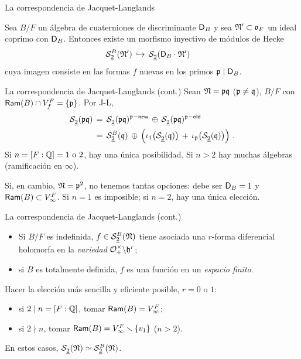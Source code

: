\begin{frame}{La correspondencia de Jacquet-Langlands}
	\begin{teoCorrespondenciaJL}\label{thm:correspondenciajl}
		Sea $B/F$ un \'{a}lgebra de cuaterniones de discriminante
		$\disc[B]$ y sea $\frak N'\subset\oka F$ un ideal coprimo con
		$\disc[B]$. Entonces existe un morfismo inyectivo de
		m\'{o}dulos de Hecke
		\begin{align*}
			& \spitzH[B]2{\frak N'} \,\hookrightarrow\,
				\spitzH2{\disc[B]\cdot\frak N'}
		\end{align*}
		cuya imagen consiste en las formas $f$ nuevas en los primos
		$\frak p\mid\disc[B]$.
	\end{teoCorrespondenciaJL}
\end{frame}

\begin{frame}{La correspondencia de Jacquet-Langlands (cont.)}
	Sean $\frak N=\frak p\frak q$ ($\frak p\not =\frak q$), $B/F$ con
	$\Ram(B)\cap\lugares[f]{F}=\{\frak p\}$. Por J-L,
	\begin{align*}
		\spitzH2{\frak p\frak q} & \,=\,
			\spitzH2{\frak p\frak q}^{\frak p-\neue}\,\oplus\,
			\spitzH2{\frak p\frak q}^{\frak p-\oude} \\
		& \,=\,\spitzH[B]2{\frak q}\,\oplus\,
			\Big(\iota_1\big(\spitzH2{\frak q}\big)\,+\,
				\iota_{\frak p}\big(\spitzH2{\frak q}\big)
				\Big)
		\text{ .}
	\end{align*}
	Si $n=[F:\bb Q]=1\text{ o }2$, hay una \'{u}nica posibilidad.
	Si $n>2$ hay muchas \'{a}lgebras (ramificaci\'{o}n en $\infty$).

	Si, en cambio, $\frak N=\frak p^2$, no tenemos tantas opciones: debe
	ser $\disc[B]=1$ y $\Ram(B)\subset\lugares[\infty]F$. Si $n=1$ es
	imposible; si $n=2$, hay una \'{u}nica elecci\'{o}n.
\end{frame}

\begin{frame}{La correspondencia de Jacquet-Langlands (cont.)}
	\begin{obsCorrespondenciaJL}\label{obs:correspondenciajl}
		\begin{itemize}
			\item Si $B/F$ es indefinida,
				$f\in\spitzH[B]2{\frak N}$ tiene asociada una
				$r$-forma diferencial holomorfa en la
				\emph{variedad}
				$\cal O^\times_+\backslash\hP^r$;
			\item si $B$ es totalmente definida, $f$ es una
				funci\'{o}n en un \emph{espacio finito}.
		\end{itemize}
	\end{obsCorrespondenciaJL}
	Hacer la elecci\'{o}n m\'{a}s sencilla y eficiente posible,
	$r=0\text{ o }1$:
	\begin{itemize}
		\item si $2\mid n=[F:\bb Q]$, tomar
			$\Ram(B)=\lugares[\infty]F$;
		\item si $2\nmid n$, tomar
			$\Ram(B)=\lugares[\infty]F\setmin\{v_1\}$ ($n>2$).
	\end{itemize}
	En estos casos, $\spitzH2{\frak N}\simeq\spitzH[B]2{\frak N}$.
\end{frame}
